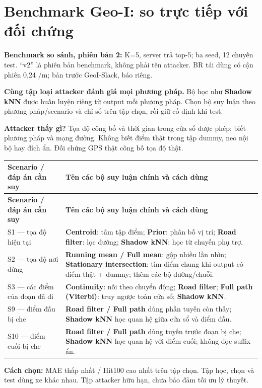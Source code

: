 \section{Benchmark Geo-I: so trực tiếp với đối chứng}
\textbf{Benchmark so sánh, phiên bản 2:} K=5, server trả top-5; ba seed, 12 chuyến test. “v2” là phiên bản benchmark, không phải tên attacker. BR tái dùng có cận phiên 0,24 /m; bản trước GeoI-Slack, báo riêng.

\textbf{Cùng tập loại attacker đánh giá mọi phương pháp.} Bộ học như \textbf{Shadow kNN} được huấn luyện riêng từ output mỗi phương pháp. Chọn bộ suy luận theo phương pháp/scenario và chỉ số trên tập chọn, rồi giữ cố định khi test.

\textbf{Attacker thấy gì?} Tọa độ công bố và thời gian trong cửa sổ được phép; biết phương pháp và mạng đường. Không biết điểm thật trong tập dummy, neo nội bộ hay đích ẩn. Đối chứng GPS thật công bố tọa độ thật.

\begingroup\small
\begin{longtable}{@{}P{4.405cm}P{12.514cm}@{}}
\toprule
\textbf{Scenario / đáp án cần suy} & \textbf{Tên các bộ suy luận chính và cách dùng}\\\midrule
\endfirsthead
\toprule
\textbf{Scenario / đáp án cần suy} & \textbf{Tên các bộ suy luận chính và cách dùng}\\\midrule
\endhead
\bottomrule\endfoot
S1 — tọa độ hiện tại & \textbf{Centroid}: tâm tập điểm; \textbf{Prior}: phân bố vị trí; \textbf{Road filter}: lọc đường; \textbf{Shadow kNN}: học từ chuyến phụ trợ.\\
\addlinespace[3pt]
S2 — tọa độ nơi dừng & \textbf{Running mean / Full mean}: gộp nhiều lần nhìn; \textbf{Stationary intersection}: tìm điểm chung khi output có điểm thật + dummy; thêm các bộ đường/chuỗi.\\
\addlinespace[3pt]
S3 — các điểm của đoạn đã đi & \textbf{Continuity}: nối theo chuyển động; \textbf{Road filter}; \textbf{Full path (Viterbi)}: truy ngược toàn cửa sổ; \textbf{Shadow kNN}.\\
\addlinespace[3pt]
S9 — điểm đầu bị che & \textbf{Road filter / Full path} dùng phần tuyến còn thấy; \textbf{Shadow kNN} học quan hệ giữa cửa sổ và điểm đầu.\\
\addlinespace[3pt]
S10 — điểm cuối bị che & \textbf{Road filter / Full path} dùng tuyến trước đoạn bị che; \textbf{Shadow kNN} học quan hệ với điểm cuối; không đọc suffix ẩn.\\
\end{longtable}
\endgroup
\textbf{Cách chọn:} MAE thấp nhất / Hit100 cao nhất trên tập chọn. Tập học, chọn và test dùng xe khác nhau. Tập attacker hữu hạn, chưa bảo đảm tối ưu lý thuyết.

